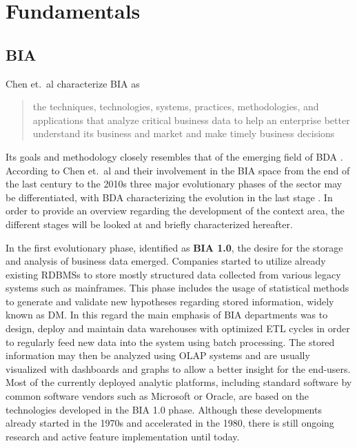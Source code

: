 \chapter{Fundamentals}
\label{chap:fund}

\section{\acl{BIA}}

Chen et.~al characterize \ac{BIA} as \blockcquote[p.~1166]{chen2012business}{the techniques, technologies, systems, practices, methodologies, and applications that analyze critical business data to help an enterprise better understand its business and market and make timely business decisions}. Its goals and methodology closely resembles that of the emerging field of \ac{BDA} \autocite[][p.~1166]{chen2012business}. 
According to Chen et.~al and their involvement in the \ac{BIA} space from the end of the last century to the 2010s three major evolutionary phases of the sector may be differentiated, with \ac{BDA} characterizing the evolution in the last stage \autocite[][p.~1168 \psqq]{chen2012business}. In order to provide an overview regarding the development of the context area, the different stages will be looked at and briefly characterized hereafter.

In the first evolutionary phase, identified as \textbf{\ac{BIA} 1.0}, the desire for the storage and analysis of business data emerged. Companies started to utilize already existing \acp{RDBMS} to store mostly structured data collected from various legacy systems such as mainframes. This phase includes the usage of statistical methods to generate and validate new hypotheses regarding stored information, widely known as \ac{DM}. In this regard the main emphasis of \ac{BIA} departments was to design, deploy and maintain data warehouses with optimized \ac{ETL} cycles in order to regularly feed new data into the system using batch processing. The stored information may then be analyzed using \ac{OLAP} systems and are usually visualized with dashboards and graphs to allow a better insight for the end-users.
Most of the currently deployed analytic platforms, including standard software by common software vendors such as Microsoft or Oracle, are based on the technologies developed in the \ac{BIA} 1.0 phase. Although these developments already started in the 1970s and accelerated in the 1980, there is still ongoing research and active feature implementation until today. \autocite[][p.~1166 \psq]{chen2012business}

